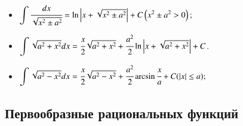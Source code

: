 \documentclass[twoside, a4paperpt, fleqn]{extarticle}
\begin{document}
\begin{itemize}
    \item $\displaystyle \int \cfrac{d x}{\sqrt{x^{2} \pm a^{2}}}=\ln \left|x+\sqrt{x^{2} \pm a^{2}}\right|+C\left(x^{2} \pm a^{2}>0\right) ;$
    \item $\displaystyle \int \sqrt{a^{2}+x^{2}} d x=\cfrac{x}{2} \sqrt{a^{2}+x^{2}}+\cfrac{a^{2}}{2} \ln \left|x+\sqrt{a^{2}+x^{2}}\right|+C$.
    \item $\displaystyle \int \sqrt{a^{2}-x^{2}} d x=\cfrac{x}{2} \sqrt{a^{2}-x^{2}}+\cfrac{a^{2}}{2} \arcsin \cfrac{x}{a}+C(|x| \leq a) ;$
\end{itemize}

\subsection*{Первообразные рациональных функций}
\end{document}
